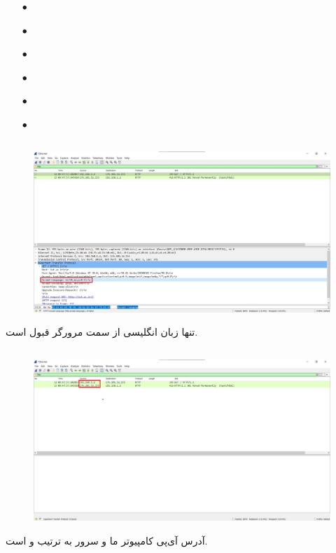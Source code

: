 \documentclass{article}
\begin{document}
\subsubsection{}
\begin{itemize}
	\item [$\bullet$] 
	\item [$\bullet$] 
	\item [$\bullet$] 
	\item [$\bullet$] 
	\item [$\bullet$] 
	\item [$\bullet$] 
\end{itemize}



\subsection{}
\begin{figure}[H]
    \centering
    \includegraphics[width=1.0\textwidth]{figures/41.jpg}
    \caption{}
    \label{fig:fig1}
\end{figure}
تنها زبان انگلیسی از سمت مرورگر قبول است.
\subsection{}
\begin{figure}[H]
    \centering
    \includegraphics[width=1.0\textwidth]{figures/42.jpg}
    \caption{}
    \label{fig:fig1}
\end{figure}
آدرس آی‌پی کامپیوتر ما و سرور به ترتیب  و  است.
\end{document}
